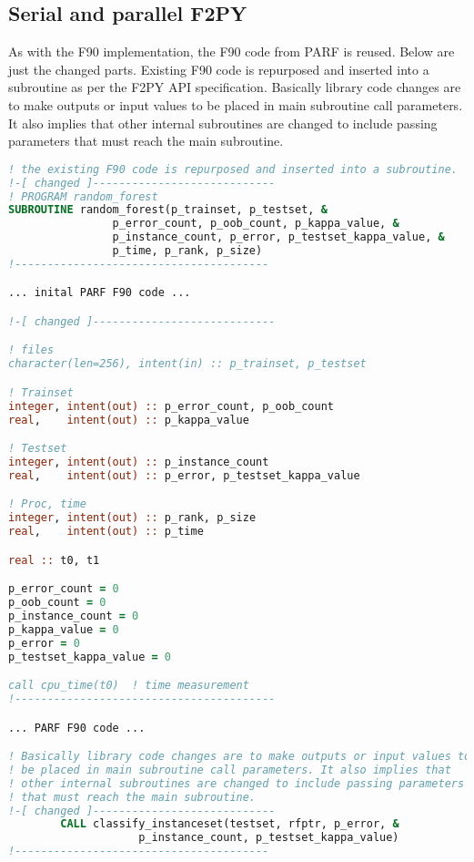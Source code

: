 \subsection{Serial and parallel F2PY}

As with the F90 implementation, the F90 code from PARF is reused. Below are just the changed parts. Existing F90 code is repurposed and inserted into a subroutine as per the F2PY API specification. Basically library code changes are to make outputs or input values to be placed in main subroutine call parameters. It also implies that other internal subroutines are changed to include passing parameters that must reach the main subroutine.

\begin{lstlisting}[language=Fortran, caption={Serial F2PY implementation of the RF test case - F90 module code.}]
! the existing F90 code is repurposed and inserted into a subroutine.
!-[ changed ]----------------------------
! PROGRAM random_forest
SUBROUTINE random_forest(p_trainset, p_testset, &
                p_error_count, p_oob_count, p_kappa_value, &
                p_instance_count, p_error, p_testset_kappa_value, &
                p_time, p_rank, p_size)
!---------------------------------------

... inital PARF F90 code ...

!-[ changed ]----------------------------

! files
character(len=256), intent(in) :: p_trainset, p_testset

! Trainset
integer, intent(out) :: p_error_count, p_oob_count
real,    intent(out) :: p_kappa_value

! Testset
integer, intent(out) :: p_instance_count
real,    intent(out) :: p_error, p_testset_kappa_value

! Proc, time
integer, intent(out) :: p_rank, p_size
real,    intent(out) :: p_time

real :: t0, t1

p_error_count = 0
p_oob_count = 0
p_instance_count = 0
p_kappa_value = 0
p_error = 0 
p_testset_kappa_value = 0

call cpu_time(t0)  ! time measurement
!----------------------------------------

... PARF F90 code ...

! Basically library code changes are to make outputs or input values to 
! be placed in main subroutine call parameters. It also implies that 
! other internal subroutines are changed to include passing parameters 
! that must reach the main subroutine.
!-[ changed ]----------------------------
        CALL classify_instanceset(testset, rfptr, p_error, &
                    p_instance_count, p_testset_kappa_value)
!---------------------------------------


\end{lstlisting}
